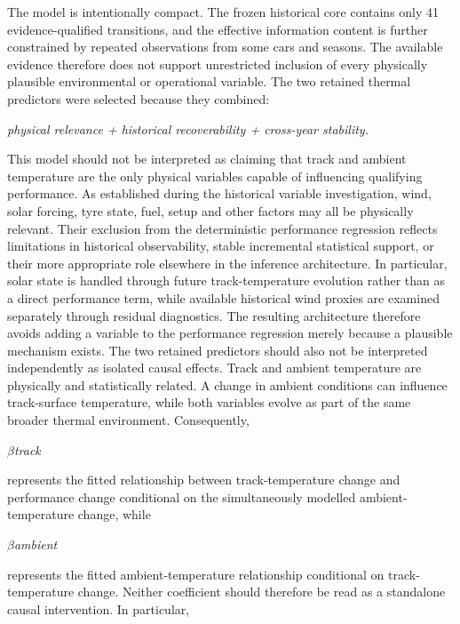 The model is intentionally compact. The frozen historical core contains only 41 evidence-qualified transitions, and the effective information content is further constrained by repeated observations from some cars and seasons. The available evidence therefore does not support unrestricted inclusion of every physically plausible environmental or operational variable. The two retained thermal predictors were selected because they combined:

\begin{center}\textit{physical relevance + historical recoverability + cross-year stability.}\end{center}

This model should not be interpreted as claiming that track and ambient temperature are the only physical variables capable of influencing qualifying performance. As established during the historical variable investigation, wind, solar forcing, tyre state, fuel, setup and other factors may all be physically relevant. Their exclusion from the deterministic performance regression reflects limitations in historical observability, stable incremental statistical support, or their more appropriate role elsewhere in the inference architecture. In particular, solar state is handled through future track-temperature evolution rather than as a direct performance term, while available historical wind proxies are examined separately through residual diagnostics. The resulting architecture therefore avoids adding a variable to the performance regression merely because a plausible mechanism exists. The two retained predictors should also not be interpreted independently as isolated causal effects. Track and ambient temperature are physically and statistically related. A change in ambient conditions can influence track-surface temperature, while both variables evolve as part of the same broader thermal environment. Consequently,

\begin{center}\textit{\ensuremath{\beta}track}\end{center}

represents the fitted relationship between track-temperature change and performance change conditional on the simultaneously modelled ambient-temperature change, while

\begin{center}\textit{\ensuremath{\beta}ambient}\end{center}

represents the fitted ambient-temperature relationship conditional on track-temperature change. Neither coefficient should therefore be read as a standalone causal intervention. In particular,

